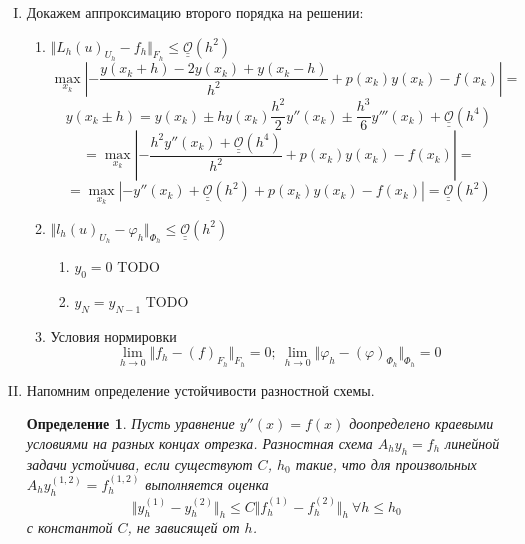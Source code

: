 \documentclass[12pt]{article}
\newtheorem*{definition}{Определение}
\def\bigO{ \underline{\underline{\mathcal{O}}} }
\begin{document}
    \newpage

    \begin{enumerate}[I.]
        \item Докажем аппроксимацию второго порядка на решении:
        \begin{enumerate}
            \item $\Vert L_h(u)_{U_h}-f_h\Vert_{F_h}\leq\bigO(h^2)$
            \[\max_{x_k}\left|-\frac{y(x_k+h)-2y(x_k)+y(x_k-h)}{h^2}+p(x_k)y(x_k)-f(x_k)\right|=\]
            \[y(x_k\pm h)=y(x_k)\pm hy(x_k)\frac{h^2}{2}y''(x_k)\pm\frac{h^3}{6}y'''(x_k)+\bigO(h^4)\]
            \[=\max_{x_k}\left|-\frac{h^2y''(x_k)+\bigO(h^4)}{h^2}+p(x_k)y(x_k)-f(x_k)\right|=\]
            \[=\max_{x_k}\left|-y''(x_k)+\bigO(h^2)+p(x_k)y(x_k)-f(x_k)\right|=\bigO(h^2)\]
            \item $\Vert l_h(u)_{U_h}-\varphi_h\Vert_{\Phi_h}\leq\bigO(h^2)$
            \begin{enumerate}
                \item $y_0 = 0$ TODO
                \item $y_N = y_{N-1}$ TODO
            \end{enumerate}
            \item Условия нормировки
            \[\lim_{h\rightarrow0}\Vert f_h-(f)_{F_h}\Vert_{F_h}=0;\ \lim_{h\rightarrow0}\Vert \varphi_h-(\varphi)_{\Phi_h}\Vert_{\Phi_h}=0\]
        \end{enumerate}

        \newpage

        \item Напомним определение устойчивости разностной схемы.
        \begin{definition}
            Пусть уравнение $y''(x)=f(x)$ доопределено краевыми
            условиями на разных концах отрезка. Разностная схема
            $A_hy_h = f_h$ линейной задачи устойчива, если существуют $C$, $h_0$ такие, что для
            произвольных $A_hy^{(1,2)}_h = f^{(1,2)}_h$ выполняется оценка
            \[\Vert y^{(1)}_h-y^{(2)}_h\Vert_h\leq C\Vert f^{(1)}_h -f^{(2)}_h\Vert_h\ \forall h\leq h_0\]
            с константой $C$, не зависящей от $h$.
        \end{definition}


\end{enumerate}
\end{document}
